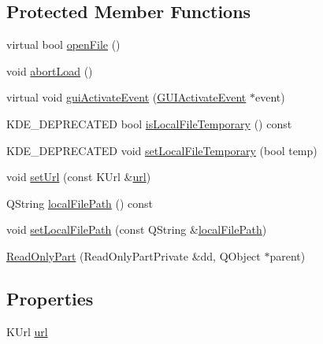\subsection*{\-Protected \-Member \-Functions}
\begin{DoxyCompactItemize}
\item 
virtual bool \hyperlink{classKParts_1_1ReadOnlyPart_a951a032497fb94b092dfd4fd134db09b}{open\-File} ()
\item 
void \hyperlink{classKParts_1_1ReadOnlyPart_abcfbcbb7ae52b89cbb4844405e8e9b6e}{abort\-Load} ()
\item 
virtual void \hyperlink{classKParts_1_1ReadOnlyPart_aa5ac9f161aef38a92bbf25891746cac0}{gui\-Activate\-Event} (\hyperlink{classKParts_1_1GUIActivateEvent}{\-G\-U\-I\-Activate\-Event} $\ast$event)
\item 
\-K\-D\-E\-\_\-\-D\-E\-P\-R\-E\-C\-A\-T\-E\-D bool \hyperlink{classKParts_1_1ReadOnlyPart_ace00a87565affbcdb3318a14d73969a6}{is\-Local\-File\-Temporary} () const 
\item 
\-K\-D\-E\-\_\-\-D\-E\-P\-R\-E\-C\-A\-T\-E\-D void \hyperlink{classKParts_1_1ReadOnlyPart_a68ab78486399e688ee5ebe9fda0cf35b}{set\-Local\-File\-Temporary} (bool temp)
\item 
void \hyperlink{classKParts_1_1ReadOnlyPart_a2d64650f22a8b72d8c56ddec21717df9}{set\-Url} (const \-K\-Url \&\hyperlink{classKParts_1_1ReadOnlyPart_a5b8edbf05a338814287496882adde559}{url})
\item 
\-Q\-String \hyperlink{classKParts_1_1ReadOnlyPart_a9c411f8471de1a852c8595719d179946}{local\-File\-Path} () const 
\item 
void \hyperlink{classKParts_1_1ReadOnlyPart_a25c155283ba9ad06eeb8b1b203e49789}{set\-Local\-File\-Path} (const \-Q\-String \&\hyperlink{classKParts_1_1ReadOnlyPart_a9c411f8471de1a852c8595719d179946}{local\-File\-Path})
\item 
\hyperlink{classKParts_1_1ReadOnlyPart_a08c76aee8709e9956d79266ba02791ff}{\-Read\-Only\-Part} (\-Read\-Only\-Part\-Private \&dd, \-Q\-Object $\ast$parent)
\end{DoxyCompactItemize}
\subsection*{\-Properties}
\begin{DoxyCompactItemize}
\item 
\-K\-Url \hyperlink{classKParts_1_1ReadOnlyPart_a5b8edbf05a338814287496882adde559}{url}
\end{DoxyCompactItemize}


